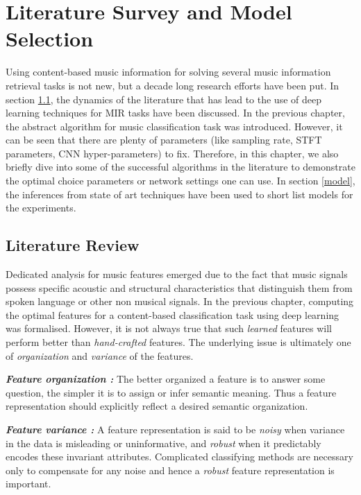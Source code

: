 


\chapter{Literature Survey and Model Selection } %

\label{Chapter3} %

Using content-based music information for solving several music information retrieval tasks is not new, but a decade long research efforts have been put. In section \ref{literature}, the dynamics of the literature that has lead to the use of deep learning techniques for MIR tasks have been discussed. In the previous chapter, the abstract algorithm for music classification task was introduced. However, it can be seen that there are plenty of parameters (like sampling rate, STFT parameters, CNN hyper-parameters) to fix. Therefore, in this chapter, we also briefly dive into some of the successful algorithms in the literature to demonstrate the optimal choice parameters or network settings one can use. In section \ref{model}, the inferences from state of art techniques have been used to short list models for the experiments.       


\section{Literature Review}
\label{literature}
Dedicated analysis for music features emerged due to the fact that music signals possess specific acoustic and structural characteristics that distinguish them from spoken language or other non musical signals. In the previous chapter, computing the optimal features for a content-based classification task using deep learning was formalised. However, it is not always true that such \textit{learned} features will perform better than \textit{hand-crafted} features. The underlying issue is ultimately one of \textit{organization} and \textit{variance} of the features. 
\bigskip 

\noindent \textit{\textbf{Feature organization :}} The better organized a feature is to answer some question, the simpler it is to assign or infer semantic meaning. Thus a feature representation should explicitly reflect a desired semantic organization. 

\noindent \textit{\textbf{Feature variance :}} A feature representation is said to be \textit{noisy} when variance in the data is misleading or uninformative, and \textit{robust} when it predictably encodes these invariant attributes. Complicated classifying methods are necessary only to compensate for any noise and hence a \textit{robust} feature representation is important.
\bigskip

